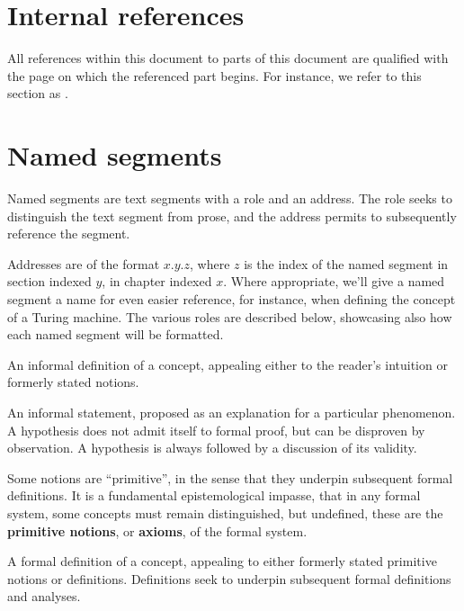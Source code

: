 \section{Internal references} \label{sec:preface:internal-references}

All references within this document to parts of this document are qualified
with the page on which the referenced part begins. For instance, we refer to
this section as .

\section{Named segments}

Named segments are text segments with a role and an address. The role seeks to
distinguish the text segment from prose, and the address permits to
subsequently reference the segment.

Addresses are of the format \mbox{$x$.$y$.$z$}, where $z$ is the index of the
named segment in section indexed $y$, in chapter indexed $x$. Where
appropriate, we'll give a named segment a name for even easier reference, for
instance, when defining the concept of a Turing machine. The various roles are
described below, showcasing also how each named segment will be formatted.

\begin{notion} An informal definition of a concept, appealing either to the
reader's intuition or formerly stated notions. \end{notion}

\begin{hypothesis} An informal statement, proposed as an explanation for a
particular phenomenon. A hypothesis does not admit itself to formal proof, but
can be disproven by observation. A hypothesis is always followed by a
discussion of its validity. \end{hypothesis}

Some notions are ``primitive'', in the sense that they underpin subsequent
formal definitions. It is a fundamental epistemological impasse, that in any
formal system, some concepts must remain distinguished, but undefined, these
are the \textbf{primitive notions}, or \textbf{axioms}, of the formal system.

\begin{definition} A formal definition of a concept, appealing to either
formerly stated primitive notions or definitions. Definitions seek to underpin
subsequent formal definitions and analyses. \end{definition}

